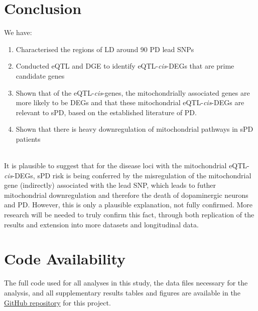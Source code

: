 \documentclass{article}
\begin{document}
\section{Conclusion}
We have:
\begin{enumerate}
    \item Characterised the regions of LD around 90 PD lead SNPs
    \item Conducted eQTL and DGE to identify eQTL-\textit{cis}-DEGs that are prime candidate genes
    \item Shown that of the eQTL-\textit{cis}-genes, the mitochondrially associated genes are more likely to be DEGs and that these mitochondrial eQTL-\textit{cis}-DEGs are relevant to sPD, based on the established literature of PD.
    \item Shown that there is heavy downregulation of mitochondrial pathways in sPD patients
\end{enumerate}
\\It is plausible to suggest that for the disease loci with the mitochondrial eQTL-\textit{cis}-DEGs, sPD risk is being conferred by the misregulation of the mitochondrial gene (indirectly) associated with the lead SNP, which leads to futher mitochondrial downregulation and therefore the death of dopaminergic neurons and PD. However, this is only a plausible explanation, not fully confirmed. More research will be needed to truly confirm this fact, through both replication of the results and extension into more datasets and longitudinal data.
\newpage
\section{Code Availability}
The full code used for all analyses in this study, the data files necessary for the analysis, and all supplementary results tables and figures are available in the \href{https://github.com/Thomas-brightwell/PD-MSc-project-code/tree/main}{GitHub repository} for this project.
\newpage
\begin{singlespace}
\printbibliography
\end{singlespace}
\end{document}
